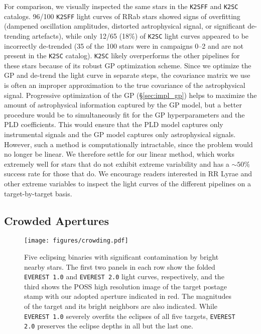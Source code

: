\documentclass[]{emulateapj}
\begin{document}
For comparison, we visually inspected the same stars in the \texttt{K2SFF} and \texttt{K2SC} 
catalogs. 96/100 \texttt{K2SFF} light curves of RRab stars showed signs of overfitting
(dampened oscillation amplitudes, distorted astrophysical signal, 
or significant de-trending artefacts), while only 12/65 (18\%) of \texttt{K2SC} light curves
appeared to be incorrectly de-trended (35 of the 100 stars were in campaigns 0--2 and are
not present in the \texttt{K2SC} catalog). \texttt{K2SC} likely overperforms the other
pipelines for these stars because of its robust GP optimization scheme. Since we optimize
the GP and de-trend the light curve in separate steps, the covariance matrix we use is often
an improper approximation to the true covariance of the astrophysical signal. Progressive
optimization of the GP (\S\ref{sec:impl_gp}) helps to maximize the amount of astrophysical
information captured by the GP model, but a better procedure would be to simultaneously
fit for the GP hyperparameters and the PLD coefficients. This would ensure that the PLD
model captures only instrumental signals and the GP model captures only astrophysical
signals. However, such a method is computationally intractable, since the problem would
no longer be linear. We therefore settle for our linear method, which works extremely
well for stars that do not exhibit extreme variability and has a ${\sim}50\%$ success
rate for those that do. We encourage readers interested in RR Lyrae and other
extreme variables to inspect the light curves of the different pipelines on a target-by-target
basis.

\subsection{Crowded Apertures}
\label{sec:crowded}

\begin{figure}[hbt]
  \begin{center}
      \texttt{[image: figures/crowding.pdf]}
      \vspace*{-0.5in}
       \caption{Five eclipsing binaries with significant contamination by bright nearby stars. The first 
       two panels in each row show the folded \texttt{EVEREST 1.0} and \texttt{EVEREST 2.0} light curves, respectively,
       and the third shows the POSS high resolution image of
       the target postage stamp with our adopted aperture indicated in red. The magnitudes of the target
       and its bright neighbors are also indicated. While \texttt{EVEREST 1.0} severely overfits the eclipses of
       all five targets, \texttt{EVEREST 2.0} preserves the eclipse depths in all but the last one.}
     \label{fig:crowding}
  \end{center}
\end{figure}
\end{document}
